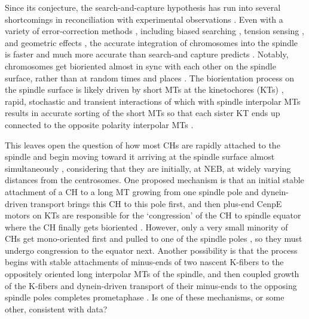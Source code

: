 \documentclass[times, twoside,onecolumn]{zHenriquesLab-StyleBioRxiv}
\begin{document}
Since its conjecture, the search-and-capture hypothesis has run into several shortcomings in reconciliation with experimental observations \cite{kliuchnikov2022celldynamo}. Even with a variety of error-correction methods \cite{zaytsev2015basic}, including biased searching \cite{wollman2005efficient}, tension sensing \cite{chen2021tension}, and geometric effects \cite{paul2009computer,Mogilner2011a,magidson2015adaptive}, the accurate integration of chromosomes into the spindle is faster and much more accurate than search-and capture predicts \cite{Renda2022,soares2022mitosis}. Notably, chromosomes get bioriented almost in sync with each other on the spindle surface, rather than at random times and places \cite{Renda2022}. The biorientation process on the spindle surface is likely driven by short MTs at the kinetochores (KTs) \cite{sikirzhytski2018microtubules}, rapid, stochastic and transient interactions of which with spindle interpolar MTs results in accurate sorting of the short MTs so that each sister KT ends up connected to the opposite polarity interpolar MTs \cite{Renda2022}. 

This leaves open the question of how most CHs are rapidly attached to the spindle and begin moving toward it arriving at the spindle surface almost simultaneously \cite{Renda2022}, considering that they are initially, at NEB, at widely varying distances from the centrosomes. One proposed mechanism is that an initial stable attachment of a CH to a long MT growing from one spindle pole and dynein-driven transport brings this CH to this pole first, and then plus-end CenpE motors on KTs are responsible for the `congression' of the CH to spindle equator where the CH finally gets bioriented \cite{skibbensDirectionalInstabilityKinetochore1993,kapoor2006chromosomes}. However, only a very small minority of CHs get mono-oriented first and pulled to one of the spindle poles \cite{magidson2011spatial}, so they must undergo congression to the equator next. Another possibility is that the process begins with stable attachments of minus-ends of two nascent K-fibers to the oppositely oriented long interpolar MTs of the spindle, and then coupled growth of the K-fibers and dynein-driven transport of their minus-ends to the opposing spindle poles completes prometaphase \cite{khodjakovMinusendCapturePreformed2003,maiatoKinetochoredrivenFormationKinetochore2004,wadsworthPluribusUnumUniversal2004}. Is one of these mechanisms, or some other, consistent with data?
\end{document}
